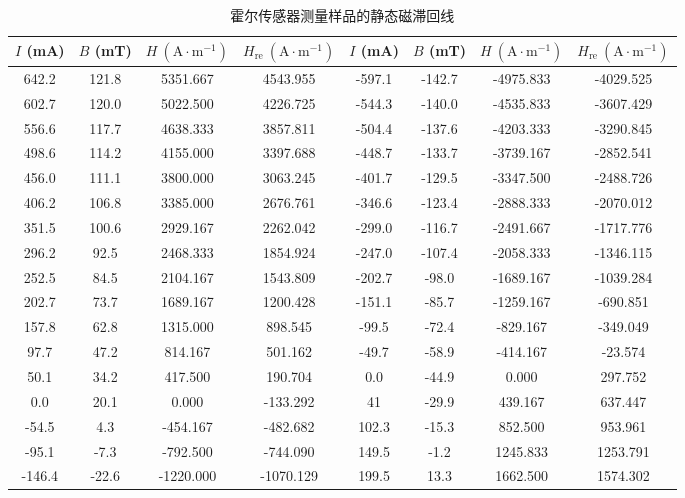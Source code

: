 \documentclass[UTF8]{article}
\theoremstyle{MyLineTheoremStyle} %
\theoremstyle{MyBlockTheoremStyle} %
\theoremstyle{MySubsubsectionStyle} %
\begin{document}
\begin{table}[H]\centering
    \caption{霍尔传感器测量样品的静态磁滞回线}
    \label{2.2表}
    \begin{tabular}{|cccc|cccc|}\hline
        $I$ (mA) & $B$ (mT) & $H \ \mathrm{(A\cdot m^{-1})}$ &  $H_{\text{re}} \ \mathrm{(A\cdot m^{-1})}$ &  $I$ (mA) & $B$ (mT) & $H \ \mathrm{(A\cdot m^{-1})}$ &  $H_{\text{re}} \ \mathrm{(A\cdot m^{-1})}$    \\
        \hline
        642.2	&121.8	&5351.667	&4543.955	& -597.1	&-142.7	&-4975.833	&-4029.525 \\
        602.7	&120.0	&5022.500	&4226.725	& -544.3	&-140.0	&-4535.833	&-3607.429 \\
        556.6	&117.7	&4638.333	&3857.811	& -504.4	&-137.6	&-4203.333	&-3290.845 \\
        498.6	&114.2	&4155.000	&3397.688	& -448.7	&-133.7	&-3739.167	&-2852.541 \\
        456.0	&111.1	&3800.000	&3063.245	& -401.7	&-129.5	&-3347.500	&-2488.726 \\
        406.2	&106.8	&3385.000	&2676.761	& -346.6	&-123.4	&-2888.333	&-2070.012 \\
        351.5	&100.6	&2929.167	&2262.042	& -299.0	&-116.7	&-2491.667	&-1717.776 \\
        296.2	&92.5	&2468.333	&1854.924	& -247.0	&-107.4	&-2058.333	&-1346.115 \\
        252.5	&84.5	&2104.167	&1543.809	& -202.7	&-98.0	&-1689.167	&-1039.284 \\
        202.7	&73.7	&1689.167	&1200.428	& -151.1	&-85.7	&-1259.167	&-690.851  \\
        157.8	&62.8	&1315.000	&898.545	& -99.5	&-72.4	&-829.167	&-349.049  \\
        97.7	&47.2	&814.167	&501.162	& -49.7	&-58.9	&-414.167	&-23.574   \\
        50.1	&34.2	&417.500	&190.704	& 0.0	&-44.9	&0.000	    &297.752   \\
        0.0	    &20.1	&0.000	    &-133.292	& 41	&-29.9	&439.167	&637.447   \\
        -54.5	&4.3	&-454.167	&-482.682	& 102.3	&-15.3	&852.500	&953.961   \\
        -95.1	&-7.3	&-792.500	&-744.090	& 149.5	&-1.2	&1245.833	&1253.791  \\
        -146.4	&-22.6	&-1220.000	&-1070.129	& 199.5	&13.3	&1662.500	&1574.302  \\

\end{tabular}
\end{table}
\end{document}
